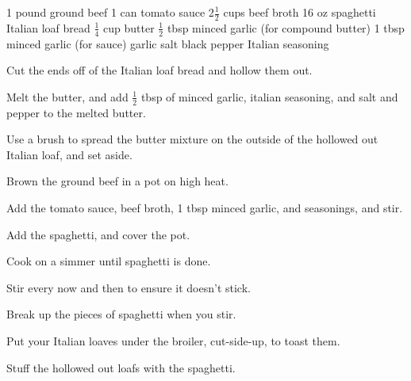 \dishtype{}
\begin{ingreds}
    1 pound ground beef
    1 can tomato sauce
    2$\frac{1}{2}$ cups beef broth
    16 oz spaghetti 
    Italian loaf bread
    $\frac{1}{4}$ cup butter
    $\frac{1}{2}$ tbsp minced garlic (for compound butter)
    1 tbsp minced garlic (for sauce)
    garlic salt
    black pepper
    Italian seasoning
\end{ingreds}
\begin{method}
    Cut the ends off of the Italian loaf bread and hollow them out.\par
    Melt the butter, and add $\frac{1}{2}$ tbsp of minced garlic, italian seasoning, and salt and pepper to the melted butter.\par
    Use a brush to spread the butter mixture on the outside of the hollowed out Italian loaf, and set aside.\par
    Brown the ground beef in a pot on high heat.\par
    Add the tomato sauce, beef broth, 1 tbsp minced garlic, and seasonings, and stir.\par
    Add the spaghetti, and cover the pot.\par
    Cook on a simmer until spaghetti is done.\par
    Stir every now and then to ensure it doesn't stick.\par
    Break up the pieces of spaghetti when you stir.\par
    Put your Italian loaves under the broiler, cut-side-up, to toast them.\par
    Stuff the hollowed out loafs with the spaghetti. 
\end{method}